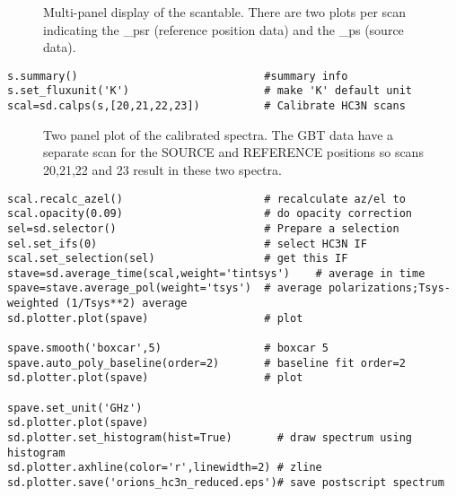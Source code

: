 \begin{figure}[h!]
\caption{\label{fig:scantable} Multi-panel display of the
  scantable. There are two plots per scan indicating the \_psr
  (reference position data) and the \_ps (source data).} 
\hrulefill
\end{figure}
 
\small
\begin{verbatim}
s.summary()                             #summary info                                   
s.set_fluxunit('K')                     # make 'K' default unit
scal=sd.calps(s,[20,21,22,23])          # Calibrate HC3N scans                          
\end{verbatim}
\normalsize

\begin{figure}[h!]
\caption{\label{fig:scal} Two panel plot of the calibrated
  spectra. The GBT data have a separate scan for the SOURCE and
  REFERENCE positions so scans 20,21,22 and 23 result in these two
  spectra.} 
\hrulefill
\end{figure}

\small
\begin{verbatim}
scal.recalc_azel()                      # recalculate az/el to                          
scal.opacity(0.09)                      # do opacity correction                         
sel=sd.selector()                       # Prepare a selection
sel.set_ifs(0)                          # select HC3N IF
scal.set_selection(sel)                 # get this IF
stave=sd.average_time(scal,weight='tintsys')    # average in time
spave=stave.average_pol(weight='tsys')  # average polarizations;Tsys-weighted (1/Tsys**2) average
sd.plotter.plot(spave)                  # plot

spave.smooth('boxcar',5)                # boxcar 5                                      
spave.auto_poly_baseline(order=2)       # baseline fit order=2                          
sd.plotter.plot(spave)                  # plot                                          

spave.set_unit('GHz')                                                                   
sd.plotter.plot(spave)
sd.plotter.set_histogram(hist=True)       # draw spectrum using histogram                 
sd.plotter.axhline(color='r',linewidth=2) # zline                                       
sd.plotter.save('orions_hc3n_reduced.eps')# save postscript spectrum                    
\end{verbatim}
\normalsize

